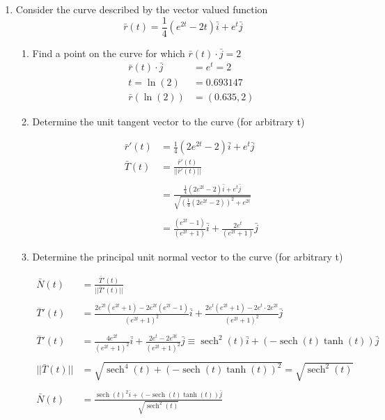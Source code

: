 \documentclass[a4paper,11pt]{article}
\begin{document}
\begin{preview}
\begin{enumerate}
\begin{enumerate}
    \end{enumerate}

    \item Consider the curve described by the vector valued function
    $$ \bar{r}(t) = \frac{1}{4}(e^{2t}-2t)\bar{i} + e^t\bar{j} $$

    \begin{enumerate}
        \item   Find a point on the curve for which $\bar{r}(t) \cdot \bar{j}=2$
        \begin{align*}
            \bar{r}(t) \cdot \bar{j} &= e^t = 2\\
            t = \ln(2)&=0.693147\\
            \bar{r}(\ln(2)) &= (0.635, 2)
        \end{align*}

        \item Determine the unit tangent vector to the curve (for arbitrary t)
        
        \begin{align*}
            \bar{r}'(t) &= \frac{1}{4}(2e^{2t}-2)\bar{i} + e^t\bar{j}\\
            \bar{T}(t) &= \frac{\bar{r}'(t)}{|| \bar{r}'(t) ||}\\\\
            &= \frac{\frac{1}{4}(2e^{2t}-2)\bar{i} + e^t\bar{j}}{\sqrt{ (\frac{1}{4}(2e^{2t}-2))^2 + e^{2t}}}\\\\
            &= \frac{(e^{2t}-1)} {(e^{2t}+1)} \bar{i} + \frac{2e^t}{ (e^{2t}+1)} \bar{j}
        \end{align*}

        \item  Determine the principal unit normal vector to the curve (for arbitrary t)
        
        \begin{align*}
            \bar{N}(t) &= \frac{\bar{T}'(t)}{|| \bar{T}'(t) ||}\\\\
            \bar{T}'(t) &= \frac{ 2e^{2t}(e^{2t}+1) - 2e^{2t}(e^{2t}-1)}{ (e^{2t}+1)^2 } \bar{i} + 
            \frac{ 2e^t (e^{2t}+1) - 2e^t \cdot 2e^{2t}}{ (e^{2t}+1)^2 }\bar{j}\\\\
            \bar{T}'(t) &= \frac{4e^{2t}}{(e^{2t}+1)^{2}}\bar{i} + \frac{2e^{t}-2e^{3t}}{(e^{2t}+1)^{2}}\bar{j} \equiv \operatorname{sech}^2(t)\bar{i} + (-\operatorname{sech}(t) \operatorname{tanh}(t))\bar{j}\\\\
            || \bar{T}(t) || &= \sqrt{ \operatorname{sech}^4(t) + (-\operatorname{sech}(t) \operatorname{tanh}(t)) ^2 } = \sqrt{\operatorname{sech}^2(t)} \\\\
            \bar{N}(t) &= \frac{\operatorname{sech}\left(t\right)^{2}\overline{i}+\left(-\operatorname{sech}\left(t\right)\tanh\left(t\right)\right)\overline{j}}{\sqrt{\operatorname{sech}^2(t)}}
        \end{align*}


\end{enumerate}
\end{enumerate}
\end{preview}
\end{document}
